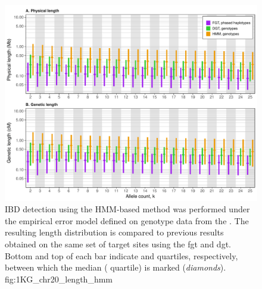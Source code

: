 

\begin{figure}[!htb]
\includegraphics[width=\textwidth]{./img/ch4/1KG_chr20_length_hmm}
{IBD detection using the HMM-based method was performed under the empirical error model defined on genotype data from the .
The resulting length distribution is compared to previous results obtained on the same set of target sites using the \gls{fgt} and \gls{dgt}.
Bottom and top of each bar indicate  and  quartiles, respectively, between which the median ( quartile) is marked (\emph{diamonds}).}
{fig:1KG_chr20_length_hmm}
\end{figure}
